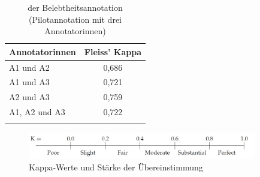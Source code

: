 \begin{table}
\centering
\label{tab:iaa-pilot}
\begin{tabular}{lc}
\lsptoprule
Annotatorinnen & Fleiss' Kappa  \\ \midrule
A1 und A2               & 0,686  \\
A1 und A3               & 0,721  \\
A2 und A3               & 0,759  \\
A1, A2 und A3           & 0,722  \\ \lspbottomrule
\end{tabular}
\caption{ der Belebtheitsannotation \\ (Pilotannotation mit drei Annotatorinnen)}
\end{table}

\begin{figure}
\begin{center}
\includegraphics[width=10cm]{images/kappa-artstein.jpg}
\caption {Kappa-Werte und Stärke der Übereinstimmung \\ \parencite[576]{Artstein2008}}
\label{abb:kappa-skala}
\end{center}
\end{figure} 

